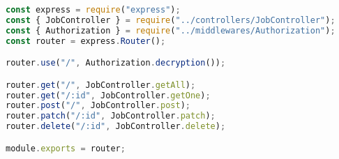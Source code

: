 \begin{lstlisting}[language=Javascript,caption={Job Route}]
const express = require("express");
const { JobController } = require("../controllers/JobController");
const { Authorization } = require("../middlewares/Authorization");
const router = express.Router();

router.use("/", Authorization.decryption());

router.get("/", JobController.getAll);
router.get("/:id", JobController.getOne);
router.post("/", JobController.post);
router.patch("/:id", JobController.patch);
router.delete("/:id", JobController.delete);

module.exports = router;
\end{lstlisting}